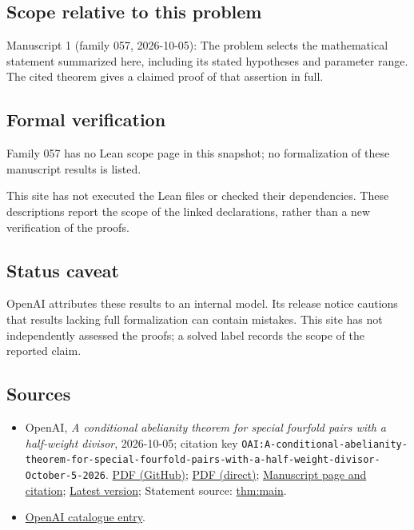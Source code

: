\documentclass[11pt]{article}
\begin{document}
\subsection{Scope relative to this problem}
Manuscript 1 (family 057, 2026-10-05): The problem selects the mathematical statement summarized here, including its stated hypotheses and parameter range. The cited theorem gives a claimed proof of that assertion in full.

\subsection{Formal verification}
Family 057 has no Lean scope page in this snapshot; no formalization of these manuscript results is listed.

This site has not executed the Lean files or checked their dependencies. These descriptions report the scope of the linked declarations, rather than a new verification of the proofs.

\subsection{Status caveat}
OpenAI attributes these results to an internal model. Its release notice cautions that results lacking full formalization can contain mistakes. This site has not independently assessed the proofs; a solved label records the scope of the reported claim.

\subsection{Sources}
\begin{itemize}
\item OpenAI, \emph{A conditional abelianity theorem for special fourfold pairs with a half-weight divisor}, 2026-10-05; citation key \texttt{OAI:A-conditional-abelianity-theorem-for-special-fourfold-pairs-with-a-half-weight-divisor-October-5-2026}. \href{https://github.com/openai/math/blob/adc7f1241b42e322a6451854ab7e4b4c146bf78a/preprints/A-conditional-abelianity-theorem-for-special-fourfold-pairs-with-a-half-weight-divisor-October-5-2026/main.pdf}{PDF (GitHub)}; \href{https://github.com/openai/math/raw/adc7f1241b42e322a6451854ab7e4b4c146bf78a/preprints/A-conditional-abelianity-theorem-for-special-fourfold-pairs-with-a-half-weight-divisor-October-5-2026/main.pdf}{PDF (direct)}; \href{https://github.com/openai/math/blob/adc7f1241b42e322a6451854ab7e4b4c146bf78a/preprints/A-conditional-abelianity-theorem-for-special-fourfold-pairs-with-a-half-weight-divisor-October-5-2026/README.md}{Manuscript page and citation}; \href{https://github.com/openai/math/blob/main/preprints/A-conditional-abelianity-theorem-for-special-fourfold-pairs-with-a-half-weight-divisor-October-5-2026/main.pdf}{Latest version}; Statement source: \href{https://github.com/openai/math/blob/adc7f1241b42e322a6451854ab7e4b4c146bf78a/preprints/A-conditional-abelianity-theorem-for-special-fourfold-pairs-with-a-half-weight-divisor-October-5-2026/build/source/sections/introduction.tex\#L39}{thm:main}.
\item \href{https://github.com/openai/math/blob/adc7f1241b42e322a6451854ab7e4b4c146bf78a/CONTENTS.md}{OpenAI catalogue entry}.
\end{itemize}
\end{document}
